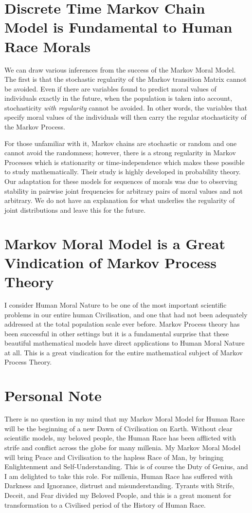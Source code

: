 \documentclass{amsart}
\begin{document}
\section{Discrete Time Markov Chain Model is Fundamental to Human Race Morals}

We can draw various inferences from the success of the Markov Moral Model.  The first is that the stochastic regularity of the Markov transition Matrix cannot be avoided.  Even if there are variables found to predict moral values of individuals exactly in the future, when the population is taken into account, stochasticity {\em with regularity} cannot be avoided.  In other words, the variables that specify moral values of the individuals will then carry the regular stochasticity of the Markov Process.  

For those unfamiliar with it, Markov chains are stochastic or random and one cannot avoid the randomness; however, there is a strong regularity in Markov Processes which is stationarity or time-independence which makes these possible to study mathematically.  Their study is highly developed in probability theory.  Our adaptation for these models for sequences of morals was due to observing stability in pairwise joint frequencies for arbitrary pairs of moral values and not arbitrary.  We do not have an explanation for what underlies the regularity of joint distributions and leave this for the future.

\section{Markov Moral Model is a Great Vindication of Markov Process Theory}

I consider Human Moral Nature to be one of the most important scientific problems in our entire human Civilisation, and one that had not been adequately addressed at the total population scale ever before.  Markov Process theory has been successful in other settings but it is a fundamental surprise that these beautiful mathematical models have direct applications to Human Moral Nature at all.  This is a great vindication for the entire mathematical subject of Markov Process Theory.

\section{Personal Note}

There is no question in my mind that my Markov Moral Model for Human Race will be the beginning of a new Dawn of Civilisation on Earth.  Without clear scientific models, my beloved people, the Human Race has been afflicted with strife and conflict across the globe for many millenia.  My Markov Moral Model will bring Peace and Civilisation to the hapless Race of Man, by bringing Enlightenment and Self-Understanding.  This is of course the Duty of Genius, and I am delighted to take this role.  For millenia, Human Race has suffered with Darkness and Ignorance, distrust and misunderstanding.  Tyrants with Strife, Deceit, and Fear divided my Beloved People, and this is a great moment for transformation to a Civilised period of the History of Human Race.  
\end{document}
